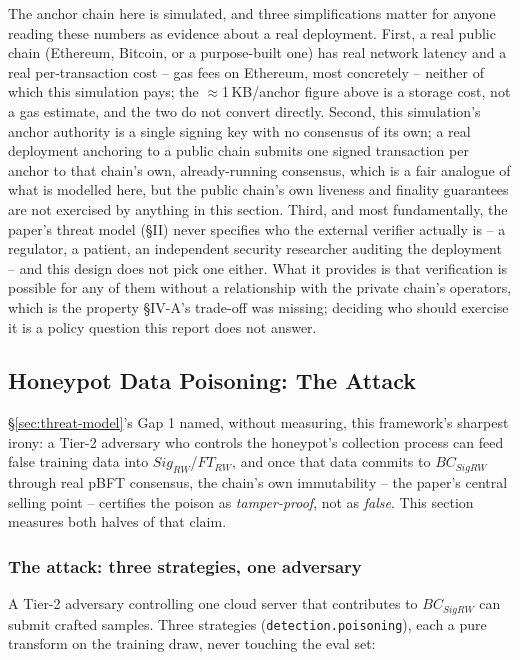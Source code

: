 \documentclass[conference]{IEEEtran}
\begin{document}
The anchor chain here is simulated, and three simplifications matter for anyone reading these
numbers as evidence about a real deployment. First, a real public chain (Ethereum, Bitcoin, or a
purpose-built one) has real network latency and a real per-transaction cost -- gas fees on
Ethereum, most concretely -- neither of which this simulation pays; the $\approx$1\,KB/anchor
figure above is a storage cost, not a gas estimate, and the two do not convert directly. Second,
this simulation's anchor authority is a single signing key with no consensus of its own; a real
deployment anchoring to a public chain submits one signed transaction per anchor to that chain's
own, already-running consensus, which is a fair analogue of what is modelled here, but the
public chain's own liveness and finality guarantees are not exercised by anything in this section.
Third, and most fundamentally, the paper's threat model (\S II) never specifies who the external
verifier actually is -- a regulator, a patient, an independent security researcher auditing the
deployment -- and this design does not pick one either. What it provides is that verification is
possible for any of them without a relationship with the private chain's operators, which is the
property \S IV-A's trade-off was missing; deciding who should exercise it is a policy question
this report does not answer.

\subsection{Honeypot Data Poisoning: The Attack}
\label{sec:m7-11}

\S\ref{sec:threat-model}'s Gap 1 named, without measuring, this framework's sharpest irony: a
Tier-2 adversary who controls the honeypot's collection process can feed false training data into
$Sig_{RW}$/$FT_{RW}$, and once that data commits to $BC_{SigRW}$ through real pBFT consensus, the
chain's own immutability -- the paper's central selling point -- certifies the poison as
\emph{tamper-proof}, not as \emph{false}. This section measures both halves of that claim.

\subsubsection{The attack: three strategies, one adversary}

A Tier-2 adversary controlling one cloud server that contributes to $BC_{SigRW}$ can submit
crafted samples. Three strategies (\texttt{detection.poisoning}), each a pure transform on the
training draw, never touching the eval set:
\end{document}
